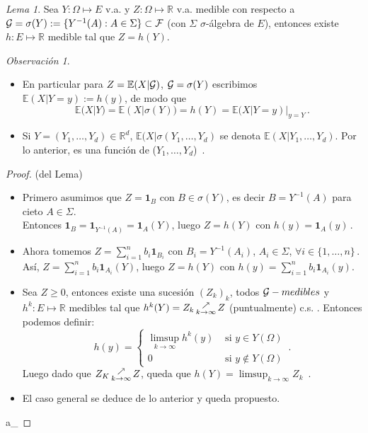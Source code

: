 \documentclass[letterpaper,11pt]{article} %
\theoremstyle{defbreak}
\theoremstyle{propbreak}
\theoremstyle{remark}
\newtheorem{remark}{Observación}[subsection]
\theoremstyle{break}
\newtheorem{lemma}{Lema}[subsection]
\def\R{\mathbb{R}}
\def\E{\mathbb{E}}
\def\nearrowk{\,\substack{\nearrow \\ \tiny{k\to\infty}}\,}
\def\beforeitemize{\leavevmode \vspace{-0.5\baselineskip}}
\def\gris{\color{mygray}}
\def\negro{\color{black}}
\def\findem{\null\hfill\color{white}a\color{black}_\square}
\begin{document}
\begin{lemma}
Sea $Y:\Omega\mapsto E$ v.a. y $Z:\Omega\mapsto \R$ v.a. medible con respecto a $\mathcal{G}=\sigma(Y):=\{Y^{-1}(A):A\in \Sigma \}\subset \mathcal{F}$ (con $\Sigma$ $\sigma$-álgebra de $E$), entonces existe $h:E\mapsto \R$ medible tal que $Z=h(Y)$.
\end{lemma}
\begin{remark}
\beforeitemize
\begin{itemize}
    \item En particular para $Z=\E(X|\G)$, $\mathcal{G}=\sigma(Y)$ escribimos $\E(X|Y=y):=h(y)$, de modo que
    $$ \E(X|Y) = \E(X|\sigma(Y)) = h(Y) = \E(X|Y=y)|_{y=Y} \, .$$
    \item Si $Y=(Y_1,\dots,Y_d)\in\R^d$, $\E(X|\sigma(Y_1,\dots,Y_d)$ se denota $\E(X|Y_1,\dots,Y_d)$. Por lo anterior, es una función de ($Y_1,\dots,Y_d$)\, .
\end{itemize}
\end{remark}
\begin{proof}
(del Lema)

\begin{itemize} \gris
    \item Primero asumimos que $Z=\mathbf{1}_B$ con $B\in\sigma(Y)$, es decir $B=Y^{-1}(A)$ para cieto  $A\in\Sigma$. \\ Entonces $\mathbf{1}_B=\mathbf{1}_{Y^{-1}(A)}=\mathbf{1}_A(Y)$, luego $Z=h(Y)$ con $h(y)=\mathbf{1}_A(y) \, .$
    \item Ahora tomemos $Z=\displaystyle \sum^n_{i=1}b_i\mathbf{1}_{B_i}$ con $B_i=Y^{-1}(A_i)$, $A_i\in\Sigma$, $\forall i\in\{1,\dots,n\} \, .$
    \\ As\'i,  $Z=\displaystyle \sum^n_{i=1}b_i\mathbf{1}_{A_i}(Y)$, luego $Z=h(Y)$ con $h(y)=\displaystyle\sum^n_{i=1}b_i\mathbf{1}_{A_i}(y)$.
    \item Sea $Z\geq 0$, entonces existe una sucesión $(Z_k)_k$, todos $\mathcal{G}-medibles$ y $h^k:E\mapsto\R$ medibles tal que $h^k(Y)=Z_k \displaystyle \nearrowk Z$ (puntualmente) c.s. . Entonces podemos definir:
    $$ h(y) = \begin{cases} \displaystyle\limsup_{k\to \infty}h^k(y)  & \mbox{ si }y\in Y(\Omega)\\
                            0 & \mbox{ si }y\notin Y(\Omega)  \end{cases} \, .$$
    Luego dado que $Z_K \nearrowk Z$, queda que $h(Y)=\displaystyle\limsup_{k\to \infty}Z_k$\, . %
    \item El caso general se deduce de lo anterior y  queda propuesto.
\end{itemize} \findem \negro
\end{proof}
\end{document}
